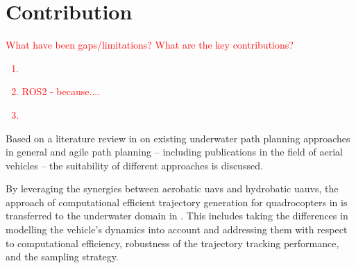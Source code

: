 \section{Contribution}

\textcolor{red}{
What have been gaps/limitations?
%
What are the key contributions?
\begin{enumerate}
    \item 
    \item ROS2 - because....
    \item
\end{enumerate}
}

Based on a literature review in  on existing underwater path planning approaches in general and agile path planning -- including publications in the field of aerial vehicles -- the suitability of different approaches is discussed. 

By leveraging the synergies between aerobatic \acp{uav} and hydrobatic \acp{uauv}, the approach of computational efficient trajectory generation for quadrocopters in \cite{MuellerHehn15} is transferred to the underwater domain in .
This includes taking the differences in modelling the vehicle's dynamics into account and addressing them with respect to computational efficiency, robustness of the trajectory tracking performance, and the sampling strategy.


